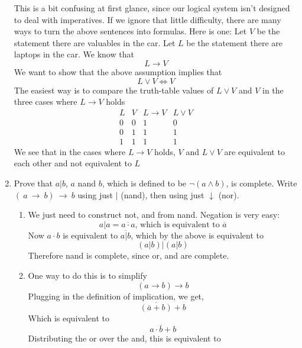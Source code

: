 \documentclass[12pt]{amsart}
\newcommand{\ra}{\rightarrow}
\begin{document}
\begin{enumerate}
        This is a bit confusing at first glance, since our logical
        system isn't designed to deal with imperatives. If we
        ignore that little difficulty, there are many ways to turn the above sentences
        into formulas. Here is one:
        Let $V$ be the statement there are valuables in the car.
        Let $L$ be the statement there are laptops in the car.
        We know that
        \[
        L \ra V
        \]
        We want to show that the above assumption
        implies that
        \[
        L \vee V \Leftrightarrow V
        \]
        The easiest way is to compare the truth-table values of
        $L \vee V$ and $V$ in the three cases where $L \ra V$ holds
        \[
        \begin{array}{c|c|c|c}
        L   &   V   &   L \ra V &  L \vee V \\\hline
        0   &   0   &   1       &   0       \\
        0   &   1   &   1       &   1       \\
        1   &   1   &   1       &   1
    \end{array}
    \]
        We see that in the cases where $L \ra V$ holds,
        $V$ and $L \vee V$ are equivalent to each other
        and not equivalent to $L$
\item   Prove that $a | b$, $a$
        nand $b$, which is defined to be
    $\neg (a \wedge b)$, is
    complete. Write
    $(~a~\rightarrow~b)~\rightarrow~b$
    using just $|$ (nand), then using just
    $\downarrow$ (nor).\\
    \begin{enumerate}
    \item
        We just need to construct not, and from nand.
        Negation is very easy:
        \[
        a \vert a = \overline{ a \cdot a } \text{, which is equivalent to } \overline{a}
        \]
        Now $a \cdot b$ is equivalent to  $\overline{a \vert b}$,
        which by the above is equivalent to
        \[
        (a \vert b) \vert (a \vert b)
        \]
        Therefore nand is complete, since or, and are complete.
    \item
        One way to do this is to simplify
        \[
        ( a \rightarrow b) \rightarrow b
        \]
        Plugging in the definition of implication, we get,
        \[
         \overline{ (\overline{a} + b)} + b
        \]
        Which is equivalent to
        \[
        a\cdot \overline{b} + b
        \]
        Distributing the or over the and, this is equivalent to

\end{enumerate}
\end{enumerate}
\end{document}
